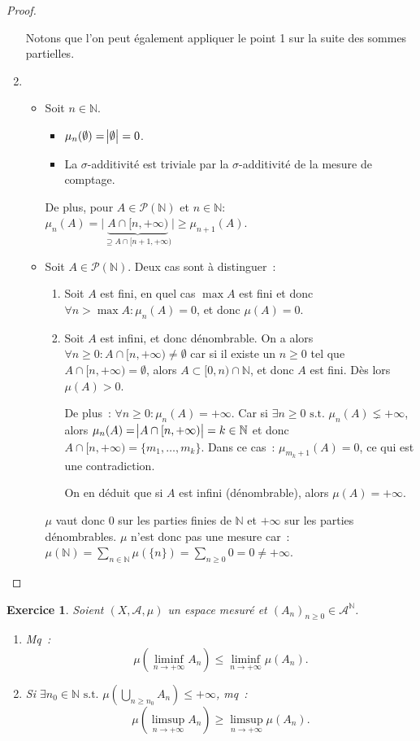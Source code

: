 \documentclass{article}
\newtheorem{ex}{Exercice}[section]
\newcommand{\pinfty}{{+\infty}}
\newcommand{\st}{\text{ s.t. }}
\newcommand{\N}{{\mathbb N}}
\begin{document}
\begin{proof}
\begin{enumerate}
	Notons que l'on peut également appliquer le point 1 sur la suite des sommes partielles.
	\item~
	\begin{itemize}
		\item Soit $n \in \N$.
		\begin{itemize}
			\item $\mu_n(\emptyset) = \abs \emptyset = 0$.
			\item La $\sigma$-additivité est triviale par la $\sigma$-additivité de la mesure de comptage.
		\end{itemize}
		De plus, pour $A \in \mathcal P(\N)$ et $n \in \N$: $\mu_n(A) = \big|\underbrace  {A \cap [n, \pinfty)}_{\supseteq A \cap [n+1, \pinfty)}\big| \geq \mu_{n+1}(A)$.
		\item Soit $A \in \mathcal P(\N)$. Deux cas sont à distinguer~:
		\begin{enumerate}
			\item Soit $A$ est fini, en quel cas $\max A$ est fini et donc $\forall n > \max A : \mu_n(A) = 0$, et donc $\mu(A) = 0$.
			\item Soit $A$ est infini, et donc dénombrable. On a alors $\forall n \geq 0 : A \cap [n, \pinfty) \neq \emptyset$ car si il existe un $n \geq 0$ tel que
			$A \cap [n, \pinfty) = \emptyset$, alors $A \subset [0, n) \cap \N$, et donc $A$ est fini. Dès lors $\mu(A) > 0$.

			De plus~: $\forall n \geq 0 : \mu_n(A) = \pinfty$. Car si $\exists n \geq 0 \st \mu_n(A) \lneq \pinfty$, alors $\mu_n(A) = \abs {A \cap [n, \pinfty)} = k \in \N$
			et donc $A \cap [n, \pinfty) = \{m_1, \ldots, m_k\}$. Dans ce cas~: $\mu_{m_k+1}(A) = 0$, ce qui est une contradiction.

			On en déduit que si $A$ est infini (dénombrable), alors $\mu(A) = \pinfty$.
		\end{enumerate}
		$\mu$ vaut donc $0$ sur les parties finies de $\N$ et $\pinfty$ sur les parties dénombrables. $\mu$ n'est donc pas une mesure car~:
		$\mu(\N) = \sum_{n \in \N}\mu(\{n\}) = \sum_{n \geq 0}0 = 0 \neq \pinfty$.
	\end{itemize}
\end{enumerate}
\end{proof}

\begin{ex}\label{ex:2.9} Soient $(X, \mathcal A, \mu)$ un espace mesuré et $(A_n)_{n \geq 0} \in {\mathcal A}^\N$.
\begin{enumerate}
	\item Mq~:
	\[\mu\left(\liminf_{n \to \pinfty}A_n\right) \leq \liminf_{n \to \pinfty}\mu(A_n).\]
	\item Si $\exists n_0 \in \N \st \mu\left(\bigcup_{n \geq n_0}A_n\right) \leq \pinfty$, mq~:
	\[\mu\left(\limsup_{n \to \pinfty}A_n\right) \geq \limsup_{n \to \pinfty}\mu(A_n).\]
\end{enumerate}
\end{ex}
\end{document}
